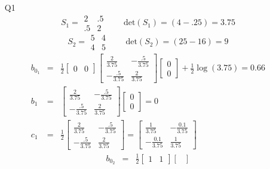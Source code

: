 \documentclass{article}
\begin{document}
\begin{itemize}
\item[Q1]
\begin{equation*}
S_1 = \begin{matrix}
2 & .5 \\
.5 & 2 
\end{matrix} \qquad\text{det}(S_1) = (4 - .25) = 3.75
\end{equation*}
\begin{equation*}
S_2 = \begin{matrix}
5 & 4 \\
4 & 5 
\end{matrix} \qquad \text{det}(S_2) = (25 - 16) = 9
\end{equation*}
\begin{eqnarray*}
b_{0_1} & =  & \frac{1}{2} \begin{bmatrix}
0 & 0
\end{bmatrix} \begin{bmatrix}
\frac{2}{3.75} & -\frac{.5}{3.75} \\
-\frac{.5}{3.75} & \frac{2}{3.75}
\end{bmatrix}
\begin{bmatrix}
0 \\
0
\end{bmatrix} + \frac{1}{2} \log(3.75) = 0.66 \\
b_1 &  =  & \begin{bmatrix}
\frac{2}{3.75} & -\frac{.5}{3.75} \\
-\frac{.5}{3.75} & \frac{2}{3.75}
\end{bmatrix} \begin{bmatrix}
0 \\ 0
\end{bmatrix} = 0\\
c_1 & = & \frac{1}{2} \begin{bmatrix}
\frac{2}{3.75} & -\frac{.5}{3.75} \\
-\frac{.5}{3.75} & \frac{2}{3.75}
\end{bmatrix}  = 
\begin{bmatrix}
\frac{1}{3.75} & -\frac{0.1}{3.75} \\
-\frac{0.1}{3.75} & \frac{1}{3.75}
\end{bmatrix}
\end{eqnarray*}
\begin{eqnarray*}
b_{0_2} & = & \frac{1}{2} \begin{bmatrix}
1 & 1
\end{bmatrix} \begin{bmatrix}

\end{bmatrix}
\end{eqnarray*}
\end{itemize}
\end{document}
